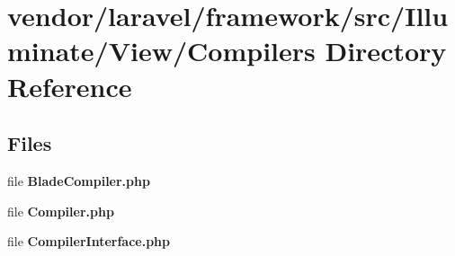 \section{vendor/laravel/framework/src/\+Illuminate/\+View/\+Compilers Directory Reference}
\label{dir_4c7df07c6aec38688a04a3b5a4203296}
\subsection*{Files}
\begin{DoxyCompactItemize}
\item 
file {\bf Blade\+Compiler.\+php}
\item 
file {\bf Compiler.\+php}
\item 
file {\bf Compiler\+Interface.\+php}
\end{DoxyCompactItemize}
